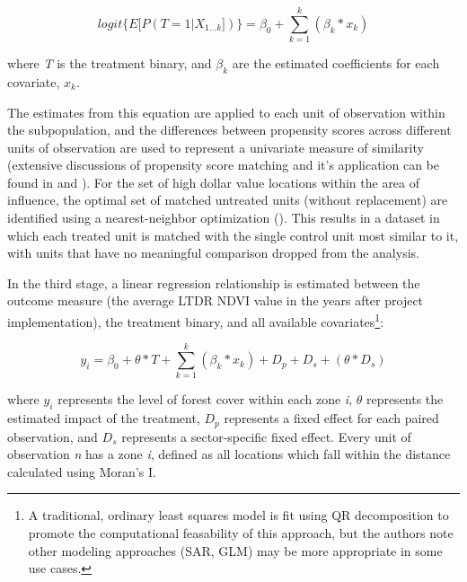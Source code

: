 \documentclass{article}\usepackage[]{graphicx}\usepackage[]{color}
\newenvironment{knitrout}{}{}  %
\begin{document}
\begin{knitrout}
\begin{equation}
logit \Bigg \{ {E} [P(T=1 | X_{1...k}]) \Bigg \}= \beta_{0} + \sum_{k=1}^{k}(\beta_{k}*x_{k})
\label{EQpropensity}
\end{equation}

where \textit{T} is the treatment binary, and \begin{math}\beta_{k}\end{math} are the estimated coefficients for each covariate, \begin{math}x_{k}\end{math}.  

The estimates from this equation are applied to each unit of observation within the subpopulation, and the differences between propensity scores across different units of observation are used to represent a univariate measure of similarity (extensive discussions of propensity score matching and it's application can be found in \cite{rubin_estimating_1997} and \cite{abbay_does_2015}).  
For the set of high dollar value locations within the area of influence, the optimal set of matched untreated units (without replacement) are identified using a nearest-neighbor optimization (\cite{ho_matchit:_2011}). 
This results in a dataset in which each treated unit is matched with the single control unit most similar to it, with units that have no meaningful comparison dropped from the analysis.
\par

In the third stage, a linear regression relationship is estimated between the outcome measure (the average LTDR NDVI value in the years after project implementation), the treatment binary, and all available covariates\footnote{A traditional, ordinary least squares model is fit using QR decomposition to promote the computational feasability of this approach, but the authors note other modeling approaches (SAR, GLM) may be more appropriate in some use cases.}:

\begin{equation}
y_i = \beta_{0} + \theta * T + \sum_{k=1}^{k}(\beta_{k}*x_{k}) + D_{p} + D_{s} + (\theta * D_{s})
\label{EQgwr}
\end{equation}

where \begin{math}y_{i}\end{math} represents the level of forest cover within each zone \textit{i}, \begin{math}\theta\end{math} represents the estimated impact of the treatment, \begin{math}D_{p}\end{math} represents a fixed effect for each paired observation, and \begin{math}D_{s}\end{math} represents a sector-specific fixed effect.
Every unit of observation \textit{n} has a zone \textit{i}, defined as all locations which fall within the distance calculated using Moran's I.


\end{knitrout}
\end{document}
